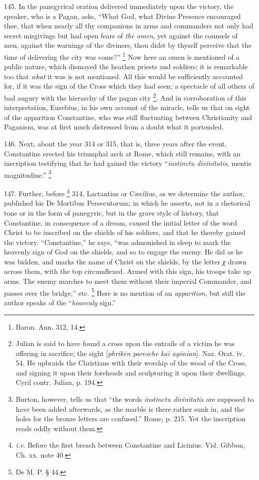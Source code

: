 145.
In the panegyrical oration delivered immediately upon the victory, the
speaker, who is a Pagan, asks, ``What God, what Divine Presence
encouraged thee, that when nearly all thy companions in arms and
commanders not only had secret misgivings but had open fears of \emph{the
omen}, yet against the counsels of men, against the warnings of the
diviners, thou didst by thyself perceive that the time of delivering
the city was come?'' \footnote{Baron. Ann. 312, 14.} Now
here an omen is mentioned of a public nature, which dismayed the
heathen priests and soldiers; it is remarkable too that \emph{what} it
was is not mentioned. All this would be sufficiently accounted for, if
it was the sign of the Cross which they had seen; a spectacle of all
others of bad augury with the hierarchy of the pagan city \footnote{Julian is said to have found a cross upon the entrails of a victim he
was offering in sacrifice; the sight [\emph{phrik\={e}n paresche kai
ag\={o}nian}]. Naz. Orat. iv. 54. He upbraids the Christians
with their worship of the wood of the Cross, and signing it upon their
foreheads and sculpturing it upon their dwellings. Cyril contr.
Julian, p. 194.}. And in corroboration of this interpretation, Eusebius, in his
own account of the miracle, tells us that on sight of the apparition
Constantine, who was still fluctuating between Christianity and
Paganism, was at first much distressed from a doubt what it portended.

146.
Next, about the year 314 or 315, that is, three years after the event,
Constantine erected his triumphal arch at Rome, which still
remains, with an inscription testifying that he had gained the victory
``\emph{instinctu divinitatis}, mentis magnitudine.'' \footnote{Burton, however, tells us that ``the words \emph{instinctu divinitatis}
are supposed to have been added afterwards, as the marble is there
rather sunk in, and the holes for the bronze letters are confused.''
Rome, p. 215. Yet the inscription reads oddly without them.}

147.
Further, before \footnote{\emph{i.e}. Before the first breach between Constantine and Licinius.
Vid. Gibbon, Ch. xx. note 40.} 314,
Lactantius or Cæcilius, as we determine the author, published his De
Mortibus Persecutorum; in which he asserts, not in a rhetorical tone
or in the form of panegyric, but in the grave style of history, that
Constantine, in consequence of a dream, caused the initial letter of
the word Christ to be inscribed on the shields of his soldiers, and
that he thereby gained the victory. ``Constantine,'' he says, ``was
admonished in sleep to mark the heavenly sign of God on the shields,
and so to engage the enemy. He did as he was bidden, and marks the
name of Christ on the shields, by the letter \emph{χ} drawn
across them, with the top circumflexed. Armed with this sign, his
troops take up arms. The enemy marches to meet them without their
imperial Commander, and passes over the bridge,'' etc. \footnote{De M. P. § 44.} Here is no mention of an \emph{apparition}, but still the
author speaks of the ``\emph{heavenly} sign.''

